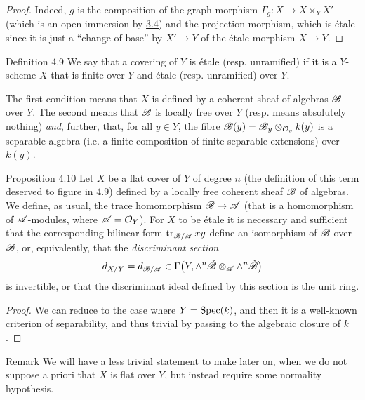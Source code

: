 \begin{proof}
  Indeed, $g$ is the composition of the graph morphism $\Gamma_g\colon X\to X\times_Y X'$ (which is an open immersion by \hyperref[I.3.4]{3.4}) and the projection morphism, which is étale since it is just a ``change of base'' by $X'\to Y$ of the étale morphism $X\to Y$.
\end{proof}

\begin{rmenv}{Definition 4.9}
\label{I.4.9}
  We say that a covering of $Y$ is étale (resp. unramified) if it is a $Y$-scheme $X$ that is finite over $Y$ and étale (resp. unramified) over $Y$.
\end{rmenv}

The first condition means that $X$ is defined by a coherent sheaf of algebras ${\mathscr{B}}$ over $Y$.
The second means that ${\mathscr{B}}$ is locally free over $Y$ (resp. means absolutely nothing) \emph{and}, further, that, for all $y\in Y$, the fibre ${\mathscr{B}}(y)={\mathscr{B}}_y\otimes_{{\mathcal{O}}_y}k(y)$ is a separable algebra (i.e. a finite composition of finite separable extensions) over $k(y)$.

\begin{itenv}{Proposition 4.10}
\label{4.10}
  Let $X$ be a flat cover of $Y$ of degree $n$ (the definition of this term deserved to figure in \hyperref[I.4.9]{4.9}) defined by a locally free coherent sheaf ${\mathscr{B}}$ of algebras.
  We define, as usual, the trace homomorphism ${\mathscr{B}}\to{\mathscr{A}}$ (that is a homomorphism of ${\mathscr{A}}$-modules, where ${\mathscr{A}}={\mathcal{O}}_Y$).
  For $X$ to be étale it is necessary and sufficient that the corresponding bilinear form $\operatorname{tr}_{{\mathscr{B}}/{\mathscr{A}}}xy$ define an isomorphism of ${\mathscr{B}}$ over ${\mathscr{B}}$, or, equivalently, that the \emph{discriminant section}
  \[
    d_{X/Y}
    = d_{{\mathscr{B}}/{\mathscr{A}}}
    \in \Gamma\big(Y,\wedge^n\check{{\mathscr{B}}}\otimes_{\mathscr{A}}\wedge^n\check{{\mathscr{B}}}\big)
  \]
  is invertible, or that the discriminant ideal defined by this section is the unit ring.
\end{itenv}

\begin{proof}
  We can reduce to the case where $Y=\operatorname{Spec}(k)$, and then it is a well-known criterion of separability, and thus trivial by passing to the algebraic closure of $k$.
\end{proof}

\begin{rmenv}{Remark}
  We will have a less trivial statement to make later on,
  when we do not suppose a priori that $X$ is flat over $Y$, but instead require some normality hypothesis.
\end{rmenv}